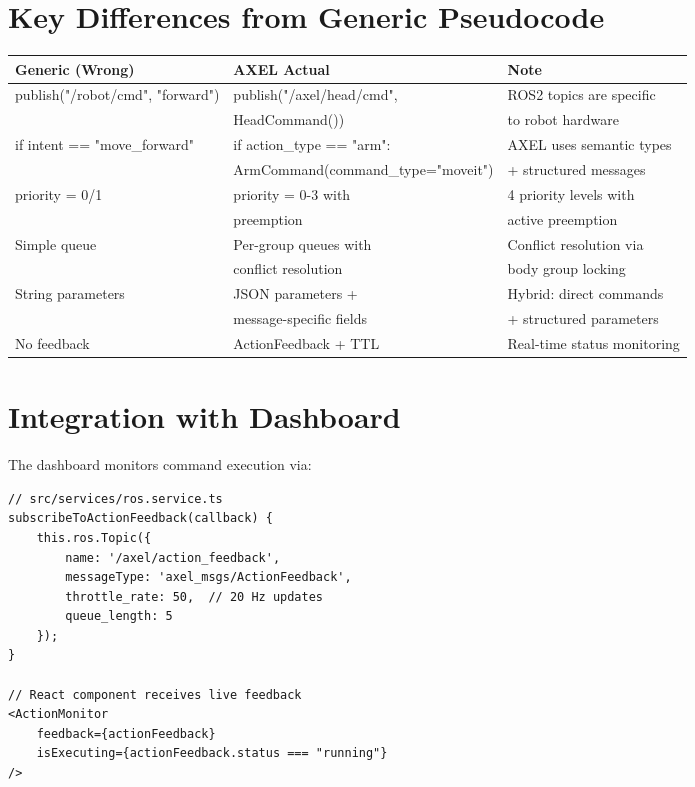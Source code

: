 \documentclass{article}
\begin{document}
\section{Key Differences from Generic Pseudocode}

\begin{tabular}{|l|l|l|}
\hline
\textbf{Generic (Wrong)} & \textbf{AXEL Actual} & \textbf{Note} \\
\hline
publish("/robot/cmd", "forward") & publish("/axel/head/cmd", & ROS2 topics are specific \\
& HeadCommand()) & to robot hardware \\
\hline
if intent == "move\_forward" & if action\_type == "arm": & AXEL uses semantic types \\
& ArmCommand(command\_type="moveit") & + structured messages \\
\hline
priority = 0/1 & priority = 0-3 with & 4 priority levels with \\
& preemption & active preemption \\
\hline
Simple queue & Per-group queues with & Conflict resolution via \\
& conflict resolution & body group locking \\
\hline
String parameters & JSON parameters + & Hybrid: direct commands \\
& message-specific fields & + structured parameters \\
\hline
No feedback & ActionFeedback + TTL & Real-time status monitoring \\
\hline
\end{tabular}

\section{Integration with Dashboard}

The dashboard monitors command execution via:

\begin{lstlisting}
// src/services/ros.service.ts
subscribeToActionFeedback(callback) {
    this.ros.Topic({
        name: '/axel/action_feedback',
        messageType: 'axel_msgs/ActionFeedback',
        throttle_rate: 50,  // 20 Hz updates
        queue_length: 5
    });
}

// React component receives live feedback
<ActionMonitor 
    feedback={actionFeedback} 
    isExecuting={actionFeedback.status === "running"}
/>
\end{lstlisting}
\end{document}

